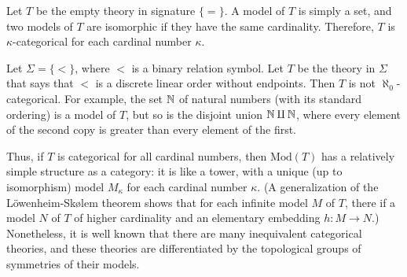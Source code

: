 \begin{example} Let $T$ be the empty theory in signature $\{ =\}$.  A
  model of $T$ is simply a set, and two models of $T$ are isomorphic
  if they have the same cardinality.  Therefore, $T$ is
  $\kappa$-categorical for each cardinal number
  $\kappa$.  \end{example}

\begin{example} Let $\Sigma = \{ <\}$, where $<$ is a binary relation
  symbol.  Let $T$ be the theory in $\Sigma$ that says that $<$ is a
  discrete linear order without endpoints.  Then $T$ is not
  $\aleph _0$-categorical.  For example, the set $\mathbb N$ of natural
  numbers (with its standard ordering) is a model of $T$, but so is
  the disjoint union $\mathbb N\amalg\mathbb N$, where every element of the second
  copy is greater than every element of the first. \end{example}

Thus, if $T$ is categorical for all cardinal numbers, then
$\mathrm{Mod}(T)$ has a relatively simple structure as a category: it
is like a tower, with a unique (up to isomorphism) model $M_\kappa$
for each cardinal number $\kappa$.  (A generalization of the
L\"owenheim-Sk{\o}lem theorem shows that for each infinite model $M$
of $T$, there if a model $N$ of $T$ of higher cardinality and an
elementary embedding $h:M\to N$.)  Nonetheless, it is well known that
there are many inequivalent categorical theories, and these theories
are differentiated by the topological groups of symmetries of their
models.





